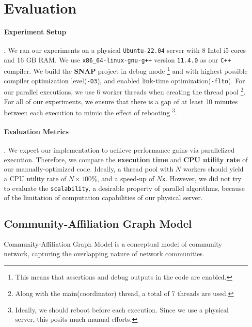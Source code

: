 \section{Evaluation}\label{sec:evaluation}

\paragraph{Experiment Setup}. We ran our experiments on a physical
\texttt{Ubuntu-22.04} server with 8 Intel i5 cores and 16 GB RAM. We use 
\texttt{x86\_64-linux-gnu-g++} version \texttt{11.4.0} as our \texttt{C++} compiler.
We build the \textbf{SNAP} project in debug mode
\footnote{This means that assertions and debug outputs in the code are enabled.}
and with highest possible compiler optimization  level(\texttt{-O3}), and 
enabled link-time optimization(\texttt{-flto}).
For our parallel executions, we use $6$ worker threads when creating the thread
pool
\footnote{Along with the main(coordinator) thread, a total of 7 threads 
are used.}. For all of our experiments, we ensure that there is a gap of at
least 10 minutes between each execution to mimic the effect of rebooting
\footnote{Ideally, we should reboot before each execution. Since we use a
physical server, this posits much manual efforts.}.

\paragraph{Evaluation Metrics}. We expect our implementation to achieve 
performance gains via parallelized execution. Therefore, we compare the 
\textbf{execution time} and \textbf{CPU utility rate} of our 
manually-optimized code. Ideally, a thread pool with $N$ workers should yield
a CPU utility rate of $N\times 100\%$, and a speed-up of $N$\texttt{x}. However,
we did not try to evaluate the \texttt{scalability}, a desirable property of 
parallel algorithms, because of the limitation of computation capabilities of
 our physical server.

\subsection{Community-Affiliation Graph Model}

\par Community-Affiliation Graph Model\citep{yang2012structure,yang2012community} 
is a conceptual model of community network, capturing the overlapping nature of 
network communities.

